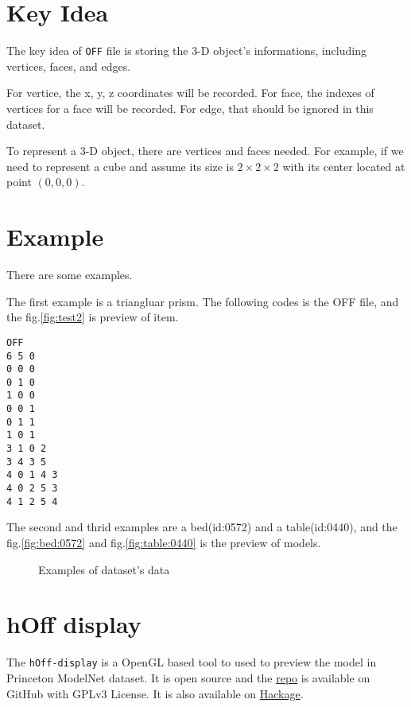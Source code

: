 \section{Key Idea}
\label{sec:keyidea}

The key idea of \verb|OFF| file is storing the 3-D object's informations, including vertices, faces, and edges.

For vertice, the x, y, z coordinates will be recorded.
For face, the indexes of vertices for a face will be recorded.
For edge, that should be ignored in this dataset.

To represent a 3-D object, there are vertices and faces needed.
For example, if we need to represent a cube and assume its size is $ 2 \times 2 \times 2$ with its center located at point $(0,0,0)$.

\section{Example}
\label{sec:example}

There are some examples.

The first example is a triangluar prism.
The following codes is the OFF file, and the fig.\ref{fig:test2} is preview of item.

\begin{lstlisting}[caption=Demo of script]
OFF
6 5 0
0 0 0
0 1 0
1 0 0
0 0 1
0 1 1
1 0 1
3 1 0 2
3 4 3 5
4 0 1 4 3
4 0 2 5 3
4 1 2 5 4
\end{lstlisting}

The second and thrid examples are a bed(id:0572) and a table(id:0440),
and the fig.\ref{fig:bed:0572} and fig.\ref{fig:table:0440} is the preview of
models.
\begin{figure}
    \centering
    \caption{Examples of dataset's data}
    \label{fig:eg}
\end{figure}

\section{hOff display}
\label{sec:hoff}

The \verb|hOff-display| is a OpenGL based tool to used to preview the model in
Princeton ModelNet dataset. It is open source and the
\href{https://github.com/Qinka/hOff}{repo} is available on GitHub with GPLv3 License. It is also available on \href{http://hackage.haskell.org/package/hOff-display}{Hackage}.

